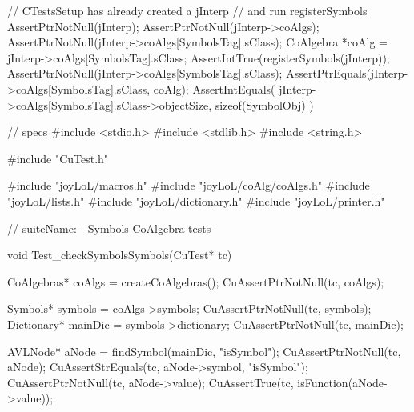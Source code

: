 
\startCTest
  // CTestsSetup has already created a jInterp
  // and run registerSymbols
  AssertPtrNotNull(jInterp);
  AssertPtrNotNull(jInterp->coAlgs);
  AssertPtrNotNull(jInterp->coAlgs[SymbolsTag].sClass);
  CoAlgebra *coAlg = jInterp->coAlgs[SymbolsTag].sClass;
  AssertIntTrue(registerSymbols(jInterp));
  AssertPtrNotNull(jInterp->coAlgs[SymbolsTag].sClass);
  AssertPtrEquals(jInterp->coAlgs[SymbolsTag].sClass, coAlg);
  AssertIntEquals(
    jInterp->coAlgs[SymbolsTag].sClass->objectSize,
    sizeof(SymbolObj)
  )
\stopCTest
\stopTestCase
\stopTestSuite


\starttyping
// specs
#include <stdio.h>
#include <stdlib.h>
#include <string.h>

#include "CuTest.h"

#include "joyLoL/macros.h"
#include "joyLoL/coAlg/coAlgs.h"
#include "joyLoL/lists.h"
#include "joyLoL/dictionary.h"
#include "joyLoL/printer.h"

// suiteName: - Symbols CoAlgebra tests -

void Test_checkSymbolsSymbols(CuTest* tc) {
  CoAlgebras* coAlgs = createCoAlgebras();
  CuAssertPtrNotNull(tc, coAlgs);

  Symbols* symbols = coAlgs->symbols;
  CuAssertPtrNotNull(tc, symbols);
  Dictionary* mainDic = symbols->dictionary;
  CuAssertPtrNotNull(tc, mainDic);

  AVLNode* aNode = findSymbol(mainDic, "isSymbol");
  CuAssertPtrNotNull(tc, aNode);
  CuAssertStrEquals(tc, aNode->symbol, "isSymbol");
  CuAssertPtrNotNull(tc, aNode->value);
  CuAssertTrue(tc, isFunction(aNode->value));
}
\stoptyping